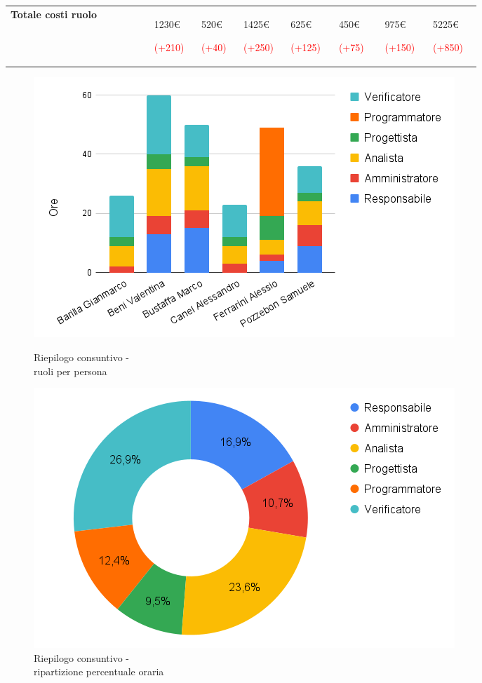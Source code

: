 {\begin{tabular}{P{0.25\linewidth}P{0.07\linewidth}P{0.07\linewidth}P{0.07\linewidth}P{0.08\linewidth}P{0.08\linewidth}P{0.08\linewidth}P{0.08\linewidth}}
            \textbf{Totale costi ruolo} & 
            1230\euro \par \textcolor{red}{(+210)}& 
            520\euro \par \textcolor{red}{(+40)}& 
            1425\euro \par \textcolor{red}{(+250)}& 
            625\euro \par \textcolor{red}{(+125)}& 
            450\euro \par \textcolor{red}{(+75)}& 
            975\euro \par \textcolor{red}{(+150)}& 
            5225\euro \par \textcolor{red}{(+850)}
        \end{tabular}
}

\begin{figure}[h!]
	\centering
	\begin{minipage}[c]{0.42\textwidth}
    	\includegraphics[scale=0.38]{../../assets/Diagrammi_Excel/consuntivo_tot_rtb.png}
		\caption{Riepilogo consuntivo - \\ruoli per persona}
	\end{minipage}
\hfill
	\begin{minipage}[c]{0.47\textwidth}
		\includegraphics[scale=0.38]{../../assets/Diagrammi_Excel/torta_tot_rtb.png}
		\caption{Riepilogo consuntivo - \\ripartizione percentuale oraria}
	\end{minipage}
\end{figure}
